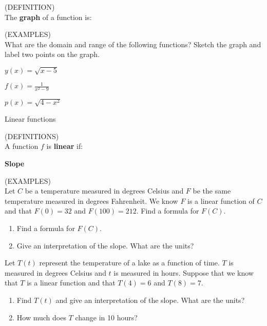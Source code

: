 \documentclass[11pt]{article}
\begin{document}
(DEFINITION)\\

The {\bf graph} of a function is:

\vspace{0.5in}

(EXAMPLES)\\

What are the domain and range of the following functions?  Sketch the graph and label two points on the graph.

\vspace{.25in}

$y(x) = \sqrt{x-5}$

\vspace{1.5in}

$f(x) = \frac{1}{x^2-9}$

\vspace{1.5in}

$p(x) = \sqrt{4-x^2}$




\pagebreak

\begin{center}
\Large
\rm{Linear functions}
\end{center}

(DEFINITIONS)\\

A function $f$ is {\bf linear} if:

\vspace{1.0in}

{\bf Slope}

\vspace{1.5in}

(EXAMPLES)\\

Let $C$ be a temperature measured in degrees Celsius and $F$ be the same temperature measured in degrees Fahrenheit.
We know $F$ is a linear function of $C$ and that $F(0)=32$ and $F(100)=212$.  Find a formula for $F(C)$.
\begin{enumerate}
\item{Find a formula for $F(C)$.}
\item{Give an interpretation of the slope.  What are the units?}
\end{enumerate}


\vspace{1.5in}

Let $T(t)$ represent the temperature of a lake as a function of time.  $T$ is measured in degrees Celsius and $t$ is measured in hours.
Suppose that we know that $T$ is a linear function and
that $T(4) = 6$ and $T(8) = 7$.
\begin{enumerate}
\item{Find $T(t)$ and give an interpretation of the slope.  What are the units?}
\item{How much does $T$ change in 10 hours?}
\end{enumerate}
\end{document}
